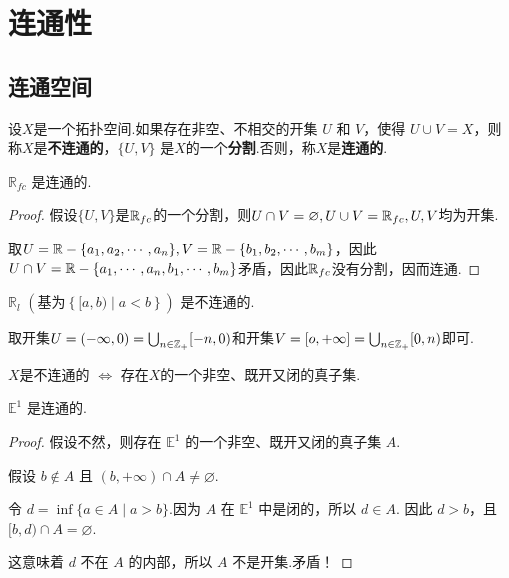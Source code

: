 \chapter{连通性}


\vspace{-1 em}
\section{连通空间}

\vspace{-1 em}
\begin{definition}[连通空间]
    设$X$是一个拓扑空间.如果存在非空、不相交的开集 $U$ 和 $V$，使得 $U \cup V = X$，则称$X$是\textbf{不连通的}，$\{U, V\}$ 是$X$的一个\textbf{分割}.否则，称$X$是\textbf{连通的}.
\end{definition}

\begin{instance}
    $\mathbb{R}_{fc}$ 是连通的.
    \begin{proof}
        假设$\{U,V\}$是$\mathbb{R}_{fc}$的一个分割，则$U\cap V=\varnothing,U\cup V=\mathbb{R}_{fc},U,V$均为开集.\par
        取$U=\mathbb{R}-\{a_1,a_2,\cdots,a_n\},V=\mathbb{R}-\{b_1,b_2,\cdots,b_m\}$，因此$U\cap V=\mathbb{R}-\{a_1,\cdots,a_n,b_1,\cdots,b_m\}$矛盾，因此$\mathbb{R}_{fc}$没有分割，因而连通.
    \end{proof}
\end{instance}

\begin{instance}
    $\mathbb{R}_l$ $\left(\text{基为} \left\{[a,b) \mid a<b\right\}\right)$ 是不连通的. \par
    取开集$U=(-\infty,0)=\bigcup_{n\in\mathbb{Z_+}}[-n,0)$和开集$V=[o,+\infty]=\bigcup_{n\in\mathbb{Z}_+}[0,n)$即可.
\end{instance}

\begin{proposition}
    $X$是不连通的 $\iff$ 存在$X$的一个非空、既开又闭的真子集.
\end{proposition}

\begin{instance}
    $\mathbb{E}^1$ 是连通的.
    \begin{proof}
        假设不然，则存在 $\mathbb{E}^1$ 的一个非空、既开又闭的真子集 $A$.\par
        假设 $b \notin A$ 且 $(b, +\infty) \cap A \neq \varnothing$.\par
        令 $d = \inf\{a \in A \mid a > b\}$.因为 $A$ 在 $\mathbb{E}^1$ 中是闭的，所以 $d \in A$.
        因此 $d > b$，且 $[b, d) \cap A = \varnothing$.\par
        这意味着 $d$ 不在 $A$ 的内部，所以 $A$ 不是开集.矛盾！
    \end{proof}
\end{instance}

